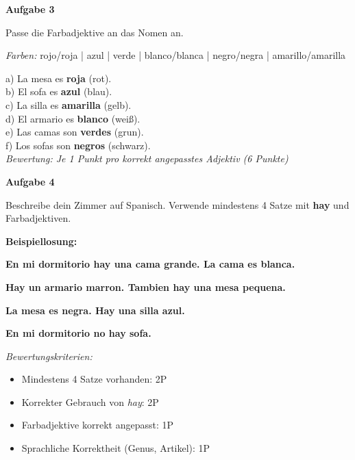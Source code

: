 \documentclass[11pt, a4paper]{article}
\newcommand{\fachfarbe}{spanisch}
\newcommand{\punktebox}[1]{\hfill\fbox{\small \_/#1}}
\newcommand{\loesung}[1]{\textcolor{loesung}{\textbf{#1}}}
\newenvironment{aufgabe}[1]{%
    \needspace{5\baselineskip}%
    \nopagebreak[4]%
    \vspace{10pt}
    \noindent\textbf{\textcolor{\fachfarbe}{Aufgabe #1}}
    \nopagebreak[4]%
    \vspace{5pt}
    \nopagebreak[4]%
    \begin{list}{}{\leftmargin=0pt}
    \item[]
}{%
    \end{list}
}
\newcommand{\es}[1]{\textcolor{\fachfarbe}{\textbf{#1}}}
\begin{document}

\begin{aufgabe}{3}
Passe die Farbadjektive an das Nomen an. \punktebox{6}
\end{aufgabe}

\begin{vokabelkasten}
\textit{Farben:} rojo/roja | azul | verde | blanco/blanca | negro/negra | amarillo/amarilla
\end{vokabelkasten}

\vspace{0.5em}

\noindent
a) La mesa es \loesung{roja} (rot). \\[0.8em]
b) El sofa es \loesung{azul} (blau). \\[0.8em]
c) La silla es \loesung{amarilla} (gelb). \\[0.8em]
d) El armario es \loesung{blanco} (weiß). \\[0.8em]
e) Las camas son \loesung{verdes} (grun). \\[0.8em]
f) Los sofas son \loesung{negros} (schwarz). \\

\textit{\textcolor{grau}{Bewertung: Je 1 Punkt pro korrekt angepasstes Adjektiv (6 Punkte)}}

\vspace{10pt}


\begin{aufgabe}{4}
Beschreibe dein Zimmer auf Spanisch. Verwende mindestens 4 Satze mit \es{hay} und Farbadjektiven. \punktebox{6}
\end{aufgabe}

\textbf{Beispiellosung:}

\loesung{En mi dormitorio hay una cama grande. La cama es blanca.}

\loesung{Hay un armario marron. Tambien hay una mesa pequena.}

\loesung{La mesa es negra. Hay una silla azul.}

\loesung{En mi dormitorio no hay sofa.}

\vspace{0.5em}
\textit{\textcolor{grau}{Bewertungskriterien:}}
\begin{itemize}
    \item Mindestens 4 Satze vorhanden: 2P
    \item Korrekter Gebrauch von \textit{hay}: 2P
    \item Farbadjektive korrekt angepasst: 1P
    \item Sprachliche Korrektheit (Genus, Artikel): 1P
\end{itemize}
\end{document}
